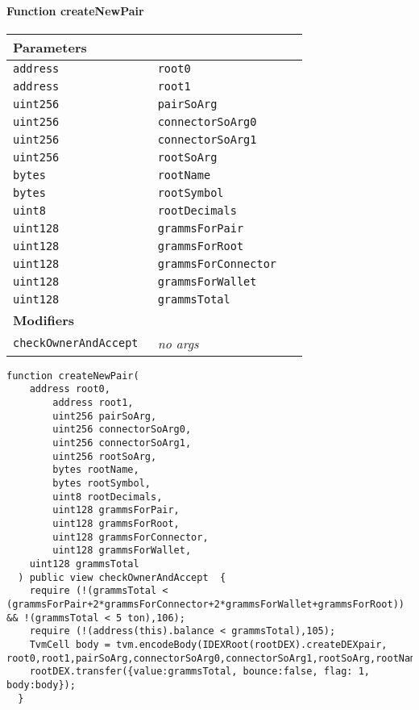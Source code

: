 \paragraph{Function createNewPair}


\ifsoltables
\noindent\begin{tabular}{|l|l|p{5cm}|}\hline
\multicolumn{3}{|l|}{\bf Parameters}\\\hline
\tt address & \tt root0 &\\\hline
\tt address & \tt root1 &\\\hline
\tt uint256 & \tt pairSoArg &\\\hline
\tt uint256 & \tt connectorSoArg0 &\\\hline
\tt uint256 & \tt connectorSoArg1 &\\\hline
\tt uint256 & \tt rootSoArg &\\\hline
\tt bytes & \tt rootName &\\\hline
\tt bytes & \tt rootSymbol &\\\hline
\tt uint8 & \tt rootDecimals &\\\hline
\tt uint128 & \tt grammsForPair &\\\hline
\tt uint128 & \tt grammsForRoot &\\\hline
\tt uint128 & \tt grammsForConnector &\\\hline
\tt uint128 & \tt grammsForWallet &\\\hline
\tt uint128 & \tt grammsTotal &\\\hline
\multicolumn{3}{|l|}{\bf Modifiers}\\\hline
\tt checkOwnerAndAccept & {\em no args} &\\\hline
\end{tabular}
\fi

\vspace{2cm}

\begin{lstlisting}[firstnumber=356]
  function createNewPair(
    address root0,
		address root1,
		uint256 pairSoArg,
		uint256 connectorSoArg0,
		uint256 connectorSoArg1,
		uint256 rootSoArg,
		bytes rootName,
		bytes rootSymbol,
		uint8 rootDecimals,
		uint128 grammsForPair,
		uint128 grammsForRoot,
		uint128 grammsForConnector,
		uint128 grammsForWallet,
    uint128 grammsTotal
  ) public view checkOwnerAndAccept  {
    require (!(grammsTotal < (grammsForPair+2*grammsForConnector+2*grammsForWallet+grammsForRoot)) && !(grammsTotal < 5 ton),106);
    require (!(address(this).balance < grammsTotal),105);
    TvmCell body = tvm.encodeBody(IDEXRoot(rootDEX).createDEXpair, root0,root1,pairSoArg,connectorSoArg0,connectorSoArg1,rootSoArg,rootName,rootSymbol,rootDecimals,grammsForPair,grammsForRoot,grammsForConnector,grammsForWallet);
    rootDEX.transfer({value:grammsTotal, bounce:false, flag: 1, body:body});
  }
\end{lstlisting}

